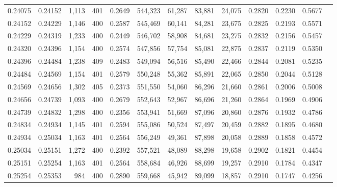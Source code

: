 \begin{tabular}{rrrrrrrrrrrrr}
0.24075 & 0.24152 & 1,113 & 401 &                                     0.2649 & 544,323 &  61,287 &  83,881 &  24,075 & 0.2820 & 0.2230 & 0.5677 \\
0.24152 & 0.24229 & 1,146 & 400 &                                     0.2587 & 545,469 &  60,141 &  84,281 &  23,675 & 0.2825 & 0.2193 & 0.5571 \\
0.24229 & 0.24319 & 1,233 & 400 &                                     0.2449 & 546,702 &  58,908 &  84,681 &  23,275 & 0.2832 & 0.2156 & 0.5457 \\
0.24320 & 0.24396 & 1,154 & 400 &                                     0.2574 & 547,856 &  57,754 &  85,081 &  22,875 & 0.2837 & 0.2119 & 0.5350 \\
0.24396 & 0.24484 & 1,238 & 409 &                                     0.2483 & 549,094 &  56,516 &  85,490 &  22,466 & 0.2844 & 0.2081 & 0.5235 \\
0.24484 & 0.24569 & 1,154 & 401 &                                     0.2579 & 550,248 &  55,362 &  85,891 &  22,065 & 0.2850 & 0.2044 & 0.5128 \\
0.24569 & 0.24656 & 1,302 & 405 &                                     0.2373 & 551,550 &  54,060 &  86,296 &  21,660 & 0.2861 & 0.2006 & 0.5008 \\
0.24656 & 0.24739 & 1,093 & 400 &                                     0.2679 & 552,643 &  52,967 &  86,696 &  21,260 & 0.2864 & 0.1969 & 0.4906 \\
0.24739 & 0.24832 & 1,298 & 400 &                                     0.2356 & 553,941 &  51,669 &  87,096 &  20,860 & 0.2876 & 0.1932 & 0.4786 \\
0.24834 & 0.24934 & 1,145 & 401 &                                     0.2594 & 555,086 &  50,524 &  87,497 &  20,459 & 0.2882 & 0.1895 & 0.4680 \\
0.24934 & 0.25034 & 1,163 & 401 &                                     0.2564 & 556,249 &  49,361 &  87,898 &  20,058 & 0.2889 & 0.1858 & 0.4572 \\
0.25034 & 0.25151 & 1,272 & 400 &                                     0.2392 & 557,521 &  48,089 &  88,298 &  19,658 & 0.2902 & 0.1821 & 0.4454 \\
0.25151 & 0.25254 & 1,163 & 401 &                                     0.2564 & 558,684 &  46,926 &  88,699 &  19,257 & 0.2910 & 0.1784 & 0.4347 \\
0.25254 & 0.25353 &   984 & 400 &                                     0.2890 & 559,668 &  45,942 &  89,099 &  18,857 & 0.2910 & 0.1747 & 0.4256 \\

\end{tabular}
